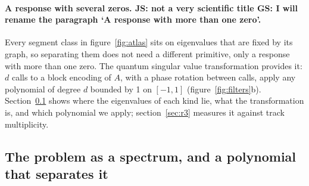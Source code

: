 \documentclass[11pt,a4paper]{article}
\newcommand{\js}[1]{{\color{blue} JS: #1 }}
\newcommand{\gs}[1]{{\color{orange!85!black} GS: #1 }}
\begin{document}
\paragraph{A response with several zeros. \js{not a very scientific title} \gs{I will rename the paragraph `A response with more than one zero'.  }} Every segment class in figure~\ref{fig:atlas} sits on eigenvalues that are fixed by its graph, so
separating them does not need a different primitive, only a response with more than one zero.
The quantum singular value transformation provides it: $d$ calls to a block encoding of $A$,
with a phase rotation between calls, apply any polynomial of degree $d$ bounded by 1 on $[-1,1]$
(figure~\ref{fig:filters}b). Section~\ref{sec:r2} shows where the eigenvalues of each kind lie,
what the transformation is, and which polynomial we apply; section~\ref{sec:r3} measures it against
track multiplicity.

\subsection{The problem as a spectrum, and a polynomial that separates it}\label{sec:r2}
\end{document}
